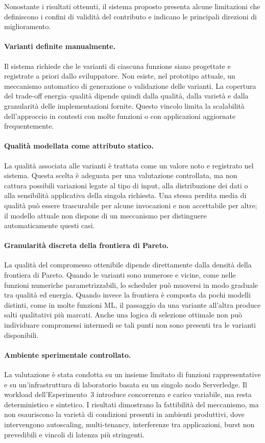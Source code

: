 Nonostante i risultati ottenuti, il sistema proposto presenta alcune
limitazioni che definiscono i confini di validità del contributo e indicano
le principali direzioni di miglioramento.

\paragraph{Varianti definite manualmente.}
Il sistema richiede che le varianti di ciascuna funzione siano progettate e
registrate a priori dallo sviluppatore. Non esiste, nel prototipo attuale,
un meccanismo automatico di generazione o validazione delle varianti. La
copertura del trade-off energia--qualità dipende quindi dalla qualità,
dalla varietà e dalla granularità delle implementazioni fornite. Questo
vincolo limita la scalabilità dell'approccio in contesti con molte funzioni
o con applicazioni aggiornate frequentemente.

\paragraph{Qualità modellata come attributo statico.}
La qualità associata alle varianti è trattata come un valore noto e
registrato nel sistema. Questa scelta è adeguata per una valutazione
controllata, ma non cattura possibili variazioni legate al tipo di input,
alla distribuzione dei dati o alla sensibilità applicativa della singola
richiesta. Una stessa perdita media di qualità può essere trascurabile per
alcune invocazioni e non accettabile per altre; il modello attuale non
dispone di un meccanismo per distinguere automaticamente questi casi.

\paragraph{Granularità discreta della frontiera di Pareto.}
La qualità del compromesso ottenibile dipende direttamente dalla densità
della frontiera di Pareto. Quando le varianti sono numerose e vicine, come
nelle funzioni numeriche parametrizzabili, lo scheduler può muoversi in modo
graduale tra qualità ed energia. Quando invece la frontiera è composta da
pochi modelli distinti, come in molte funzioni ML, il passaggio da una
variante all'altra produce salti qualitativi più marcati. Anche una logica
di selezione ottimale non può individuare compromessi intermedi se tali
punti non sono presenti tra le varianti disponibili.

\paragraph{Ambiente sperimentale controllato.}
La valutazione è stata condotta su un insieme limitato di funzioni
rappresentative e su un'infrastruttura di laboratorio basata su un singolo
nodo Serverledge. Il workload dell'Esperimento~3 introduce concorrenza e
carico variabile, ma resta deterministico e sintetico. I risultati
dimostrano la fattibilità del meccanismo, ma non esauriscono la varietà di
condizioni presenti in ambienti produttivi, dove intervengono autoscaling,
multi-tenancy, interferenze tra applicazioni, burst non prevedibili e
vincoli di latenza più stringenti.

